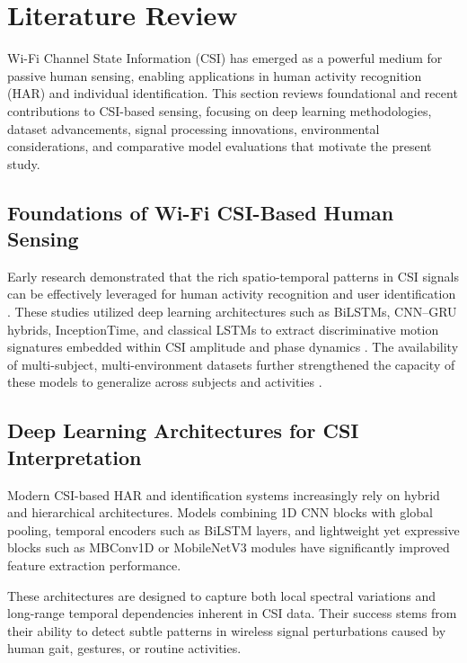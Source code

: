\section{Literature Review}

Wi-Fi Channel State Information (CSI) has emerged as a powerful medium for passive human sensing, enabling applications in human activity recognition (HAR) and individual identification. This section reviews foundational and recent contributions to CSI-based sensing, focusing on deep learning methodologies, dataset advancements, signal processing innovations, environmental considerations, and comparative model evaluations that motivate the present study.

\subsection{Foundations of Wi-Fi CSI-Based Human Sensing}

Early research demonstrated that the rich spatio-temporal patterns in CSI signals can be effectively leveraged for human activity recognition and user identification \parencite{yousefi2017survey,mosharaf2024wifiid}. These studies utilized deep learning architectures such as BiLSTMs, CNN--GRU hybrids, InceptionTime, and classical LSTMs to extract discriminative motion signatures embedded within CSI amplitude and phase dynamics \parencite{wakili2025bilstmcnngru,zhuravchak2022wifi_har}. The availability of multi-subject, multi-environment datasets further strengthened the capacity of these models to generalize across subjects and activities \parencite{alsaify2020losnlos,yang2023sensefi}.

\subsection{Deep Learning Architectures for CSI Interpretation}

Modern CSI-based HAR and identification systems increasingly rely on hybrid and hierarchical architectures. Models combining 1D CNN blocks with global pooling, temporal encoders such as BiLSTM layers, and lightweight yet expressive blocks such as MBConv1D or MobileNetV3 modules have significantly improved feature extraction performance.

These architectures are designed to capture both local spectral variations and long-range temporal dependencies inherent in CSI data. Their success stems from their ability to detect subtle patterns in wireless signal perturbations caused by human gait, gestures, or routine activities.


